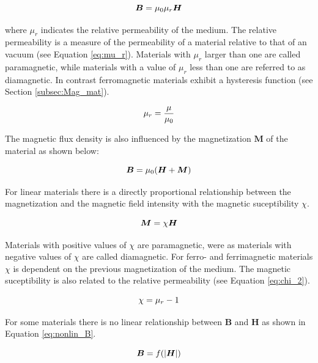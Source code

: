 \begin{equation}
\label{eq:B_tot}
\centering
\boldsymbol{B} = \mu_{0}\mu_{r}\boldsymbol{H}
\end{equation}

where $\mu_{r}$ indicates the relative permeability of the medium. The relative permeability is a measure of the permeability of a material relative to that of an vacuum (see Equation \ref{eq:mu_r}). Materials with $\mu_{r}$ larger than one are called paramagnetic, while materials with a value of $\mu_{r}$ less than one are referred to as diamagnetic. In contrast ferromagnetic materials exhibit a hysteresis function (see Section \ref{subsec:Mag_mat}).  

\begin{equation}
\label{eq:mu_r}
\centering
\mu_{r} = \frac{\mu}{\mu_{0}}
\end{equation}

The magnetic flux density is also influenced by the magnetization $\boldsymbol{M}$ of the material as shown below: 

\begin{equation}
\label{eq:Mag}
\centering
\boldsymbol{B} = \mu_{0}(\boldsymbol{H} + \boldsymbol{M})
\end{equation}

For linear materials there is a directly proportional relationship between the magnetization and the magnetic field intensity with the magnetic suceptibility $\chi$.  

\begin{equation}
\label{eq:chi}
\centering
\boldsymbol{M} = \chi\boldsymbol{H}
\end{equation}

Materials with positive values of $\chi$ are paramagnetic, were as materials with negative values of $\chi$ are called diamagnetic. For ferro- and ferrimagnetic materials $\chi$ is dependent on the previous magnetization of the medium. The magnetic suceptibility is also related to the relative permeability (see Equation \ref{eq:chi_2}).

\begin{equation}
\label{eq:chi_2}
\centering
\chi = \mu_{r}-1
\end{equation}

For some materials there is no linear relationship between $\boldsymbol{B}$ and $\boldsymbol{H}$ as shown in Equation \ref{eq:nonlin_B}.

\begin{equation}
\label{eq:nonlin_B}
\centering
\boldsymbol{B} = f(\vert\boldsymbol{H}\vert)
\end{equation}


